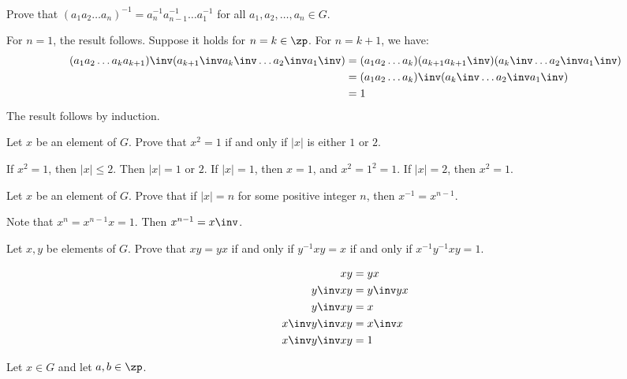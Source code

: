 \begin{problems}
\begin{sol}
$$\begin{array}{c|c|c|c|c|c|c}
        \end{array}$$
    \end{sol}
    \item Prove that $(a_1 a_2 \ldots a_n)^{-1} = a_n^{-1} a_{n-1}^{-1} \ldots a_1^{-1}$ for all $a_1, a_2, \ldots, a_n \in G$.
    \begin{sol}
        For $n = 1$, the result follows. Suppose it holds for $n = k \in \zp$. For $n = k + 1$, we have:
        \begin{align*}
            (a_1a_2 \ldots a_ka_{k + 1})\inv(a_{k + 1}\inv a_k\inv \ldots a_2\inv a_1\inv) & = (a_1a_2 \ldots a_k)(a_{k + 1}a_{k + 1}\inv) (a_{k}\inv \ldots a_2\inv a_1\inv) \\
            & = (a_1a_2 \ldots a_k)\inv(a_k\inv \ldots a_2\inv a_1\inv) \\
            & = 1
        \end{align*}
        The result follows by induction.
    \end{sol}
    \item Let $x$ be an element of $G$. Prove that $x^2 = 1$ if and only if $|x|$ is either $1$ or $2$.
    \begin{sol}
        If $x^2 = 1$, then $|x| \leq 2$. Then $|x| = 1$ or $2$. If $|x| = 1$, then $x = 1$, and $x^2 = 1^2 = 1$. If $|x| = 2$, then $x^2 = 1$.
    \end{sol}
    \item Let $x$ be an element of $G$. Prove that if $|x| = n$ for some positive integer $n$, then $x^{-1} = x^{n-1}$.
    \begin{sol}
        Note that $x^n = x^{n - 1}x = 1$. Then $x^{n - 1} = x\inv$.
    \end{sol}
    \item Let $x, y$ be elements of $G$. Prove that $xy = yx$ if and only if $y^{-1}xy = x$ if and only if $x^{-1}y^{-1}xy = 1$.
    \begin{sol}
        \begin{align*}
            xy & = yx \\
            y\inv xy & = y\inv yx \\
            y\inv xy & = x \\
            x\inv y\inv xy & = x\inv x \\
            x\inv y\inv xy & = 1
        \end{align*}
    \end{sol}
    \item
    \label{ex1.1.19}
    Let $x \in G$ and let $a, b \in \zp$.
    \begin{problems}

\end{problems}
\end{problems}
